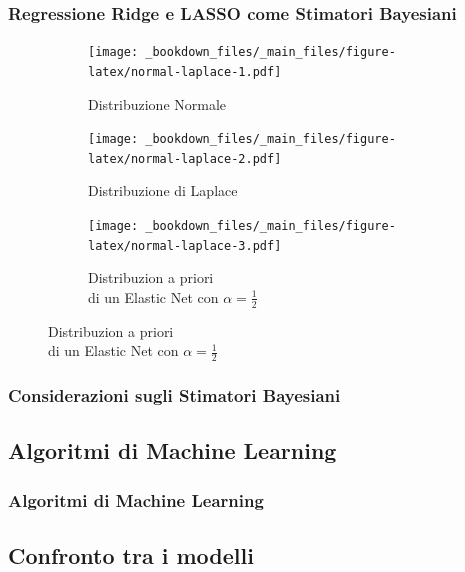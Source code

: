 \documentclass[pdf, aspectratio=169]{beamer}\usepackage[]{graphicx}\usepackage[]{color}
\theoremstyle{definition}
\begin{document}
\begin{frame}
\frametitle{Regressione Ridge e LASSO come Stimatori Bayesiani}

\begin{figure}
  \centering
  \begin{subfigure}[b]{5cm}
    \centering
    \caption{Distribuzione Normale}
    \texttt{[image: \_bookdown\_files/\_main\_files/figure-latex/normal-laplace-1.pdf]}
  \end{subfigure}
  \qquad
  \begin{subfigure}[b]{5cm}
    \centering
    \caption{Distribuzione di Laplace}
    \texttt{[image: \_bookdown\_files/\_main\_files/figure-latex/normal-laplace-2.pdf]}
  \end{subfigure}
  \par\medskip
  \begin{subfigure}[b]{5cm}
    \centering
    \caption{Distribuzion a priori \\ di un Elastic Net con $\alpha=\frac{1}{2}$}
    \texttt{[image: \_bookdown\_files/\_main\_files/figure-latex/normal-laplace-3.pdf]}
  \end{subfigure}
\end{figure}

\end{frame}


\begin{frame}
\frametitle{Considerazioni sugli Stimatori Bayesiani}


\end{frame}


\subsection{Algoritmi di Machine Learning}

\begin{frame}
\frametitle{Algoritmi di Machine Learning}

\end{frame}


\subsection{Confronto tra i modelli}
\end{document}

